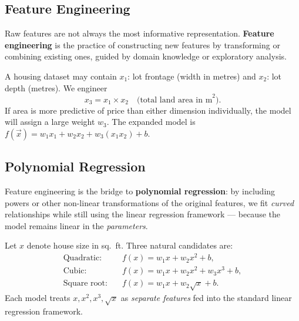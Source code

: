 \subsection{Feature Engineering}

Raw features are not always the most informative representation.
\textbf{Feature engineering} is the practice of constructing new features by
transforming or combining existing ones, guided by domain knowledge or
exploratory analysis.

\begin{example}
A housing dataset may contain $x_1$: lot frontage (width in metres) and
$x_2$: lot depth (metres). We engineer
\[
x_3 = x_1\times x_2 \quad\text{(total land area in m}^2\text{)}.
\]
If area is more predictive of price than either dimension individually, the
model will assign a large weight $w_3$. The expanded model is
$f(\vec{x})=w_1 x_1+w_2 x_2+w_3(x_1 x_2)+b$.
\end{example}

\subsection{Polynomial Regression}

Feature engineering is the bridge to \textbf{polynomial regression}: by
including powers or other non-linear transformations of the original features,
we fit \emph{curved} relationships while still using the linear regression
framework — because the model remains linear in the \emph{parameters}.

Let $x$ denote house size in sq.\ ft. Three natural candidates are:
\begin{align}
\text{Quadratic:}   &\quad f(x)=w_1 x+w_2 x^2+b,\label{eq:quad}\\
\text{Cubic:}       &\quad f(x)=w_1 x+w_2 x^2+w_3 x^3+b,\\
\text{Square root:} &\quad f(x)=w_1 x+w_2\sqrt{x}+b.
\end{align}
Each model treats $x,x^2,x^3,\sqrt{x}$ as \emph{separate features} fed into
the standard linear regression framework.

